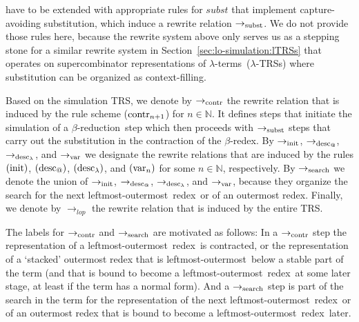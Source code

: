 \documentclass[
submission
]{dmtcs-episciences-tampered}
\makeatletter
\newcommand{\iap}[2]{#1 _{#2}}
\newcommand{\indap}[2]{#1 _{#2}}
\newcommand{\supap}[2]{#1 ^{#2}}
\newcommand{\pap}{\supap}
\newcommand{\nb}{\nobreakdash}
\newcommand{\nf}{\normalfont}
\newcommand{\nat}{\mathbb{N}}
\newcommand{\TRS}{TRS}
\newcommand{\sfolapp}{@}
\newcommand{\sfonlabs}{\lambda}
\newcommand{\slop}{\textit{lop}}\newcommand{\slopstar}{\pap{\slop}{*}}
\newcommand{\ssubst}{\textit{subst}}
\newcommand{\sred}{\to}
\newcommand{\sredi}{\indap{\sred}}
\newcommand{\scriptsearch}{\text{\nf search}}
\newcommand{\scriptcontract}{\text{\nf contr}}
\newcommand{\scriptsubst}{\text{\nf subst}}
\newcommand{\scriptinit}{\text{\nf init}}
\newcommand{\scriptdescendinfolapp}{\iap{\text{\nf desc}}{\sfolapp}}
\newcommand{\scriptdescendinfolabs}{\iap{\text{\nf desc}}{\sfonlabs}}
\newcommand{\scriptcontractn}[1]{\iap{\text{\nf contr}}{{#1}}}
\newcommand{\scriptvar}{\text{\nf var}}
\newcommand{\ssearchred}{\sredi{\scriptsearch}}
\newcommand{\ssubstred}{\sredi{\scriptsubst}}
\newcommand{\scontractred}{\sredi{\scriptcontract}}
\newcommand{\slopsimred}{\sredi{\slop}}
\newcommand{\sinitred}{\sredi{\scriptinit}}
\newcommand{\sdescendinfolappred}{\sredi{\scriptdescendinfolapp}}
\newcommand{\sdescendinfolabsred}{\sredi{\scriptdescendinfolabs}}
\newcommand{\svarred}{\sredi{\scriptvar}}
\newcommand{\lambdaterm}{$\lambda$\nb-term}
\newcommand{\lambdaterms}{\lambdaterm{s}}
\newcommand{\betareduction}{$\beta$\nb-re\-duc\-tion}
\newcommand{\betaredex}{$\beta$\nb-re\-dex}
\newcommand{\lo}{left\-most-outer\-most}
\newcommand{\loredex}{\lo\ re\-dex}
\newcommand{\lTRS}{$\lambda$\hspace*{-0.5pt}\nb-\hspace*{-0.5pt}\TRS}
\newcommand{\lTRSs}{\lTRS{s}}
\theoremstyle{plain}
\theoremstyle{definition}
\makeatother
\begin{document}
have to be extended with appropriate rules for $\ssubst$ that implement capture-avoiding substitution,
which induce a rewrite relation $\ssubstred$. 
We do not provide those rules here, because the rewrite system above only serves us as a stepping stone
for a similar rewrite system in Section~\ref{sec:lo-simulation:lTRSs}
that operates on supercombinator representations of \lambdaterms\ (\lTRSs)
where substitution can be organized as context-filling.



Based on the simulation \TRS, we denote by $\scontractred$ the rewrite relation that is induced by the rule scheme ($\scriptcontractn{n+1}$) for $n\in\nat$.
It defines steps that initiate the simulation of a \betareduction\ step which then proceeds with $\ssubstred$ steps 
  that carry out the substitution in the contraction of the \betaredex.
By $\sinitred$, $\sdescendinfolappred$, $\sdescendinfolabsred$, and $\svarred$
we designate the rewrite relations that are induced by the rules
$(\scriptinit)$, $(\scriptdescendinfolapp)$, $(\scriptdescendinfolabs)$, and $(\scriptvar_n)$ for some $n\in\nat$, respectively.
By $\ssearchred$ we denote the union of $\sinitred$, $\sdescendinfolappred$, $\sdescendinfolabsred$, and $\svarred$,
because they organize the search 
for the next \loredex\ or of an outermost redex. Finally, we denote by $\slopsimred$ the rewrite relation that is induced by the entire TRS.



The labels for $\scontractred$ and $\ssearchred$ are motivated as follows:
In a $\scontractred$ step the representation of a \loredex\ is contracted,
or the representation of a `stacked' outermost redex that is \lo\ below a stable
part of the term (and  that is bound to become
a \loredex\ at some later stage, at least if the term has a normal form). 
And a $\ssearchred$ step is part of the search in the term 
for the representation of the next \loredex\ or of an outermost redex
that is bound to become a \loredex\ later.
 


  
  
  
  
\end{document}
